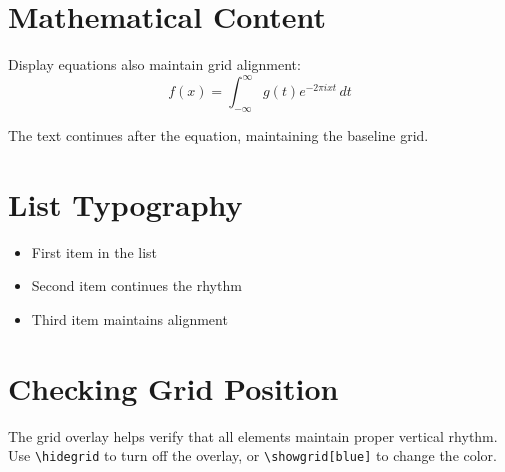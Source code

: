 \documentclass[11pt]{article}
\begin{document}
\section{Mathematical Content}

Display equations also maintain grid alignment:
\[
f(x) = \int_{-\infty}^{\infty} g(t) e^{-2\pi i x t} \, dt
\]

The text continues after the equation, maintaining the baseline grid.

\section{List Typography}

\begin{itemize}
\item First item in the list
\item Second item continues the rhythm
\item Third item maintains alignment
\end{itemize}

\section{Checking Grid Position}

\checkgrid %

The grid overlay helps verify that all elements maintain proper vertical rhythm. Use \texttt{\textbackslash hidegrid} to turn off the overlay, or \texttt{\textbackslash showgrid[blue]} to change the color.
\end{document}
